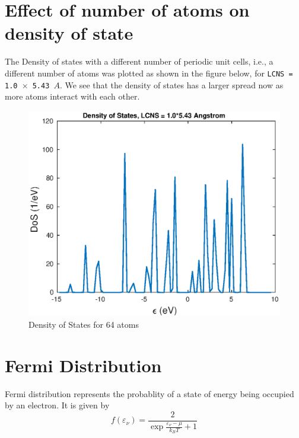\documentclass[11pt, oneside]{article}   	%
\begin{document}
\section{Effect of number of atoms on density of state}
The Density of states with a different number of periodic unit cells, i.e., a different number of atoms was plotted as shown in the figure below, for \texttt{LCNS = 1.0 $\times$ 5.43 $A$}. We see that the density of states has  a larger spread now as more atoms interact with each other.
	\begin{figure}[!htbp]
	\centering
	\includegraphics[scale=0.55]{dos_1pt0_Ucell2.eps}
	\caption{Density of States for 64 atoms}
	\end{figure}


\section{Fermi Distribution}
Fermi distribution represents the probablity of a state of energy being occupied by an electron. It is given by
	\begin{equation}
	f({\varepsilon_\nu}) = \frac{2}{ \exp{\frac{\varepsilon_\nu - \mu}{k_BT}} +1}
	\end{equation}
\end{document}
